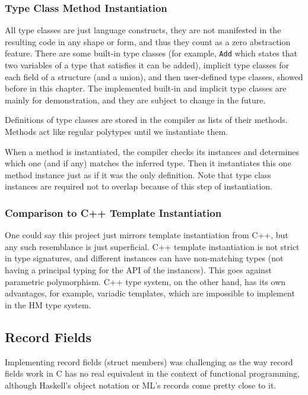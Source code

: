 \subsubsection{Type Class Method Instantiation}

All type classes are just language constructs, they are not manifested in the resulting code in any shape or form, and thus they count as a zero abstraction feature. There are some built-in type classes (for example, \lstinline{Add} which states that two variables of a type that satisfies it can be added), implicit type classes for each field of a structure (and a union), and then user-defined type classes, showed before in this chapter. The implemented built-in and implicit type classes are mainly for demonstration, and they are subject to change in the future.

Definitions of type classes are stored in the compiler as lists of their methods. Methods act like regular polytypes until we instantiate them.

When a method is instantiated, the compiler checks its instances and determines which one (and if any) matches the inferred type. Then it instantiates this one method instance just as if it was the only definition. Note that type class instances are required not to overlap because of this step of instantiation.


\subsubsection{Comparison to C++ Template Instantiation}

One could say this project just mirrors template instantiation from C++, but any such resemblance is just superficial. C++ template instantiation is not strict in type signatures, and different instances can have non-matching types (not having a principal typing for the API of the instances). This goes against parametric polymorphism. C++ type system, on the other hand, has its own advantages, for example, variadic templates, which are impossible to implement in the HM type system.

\subsection{Record Fields}
\label{ssec:recordFieldsCHM}

Implementing record fields (struct members) was challenging as the way record fields work in C has no real equivalent in the context of functional programming, although Haskell's object notation or ML's records come pretty close to it.

